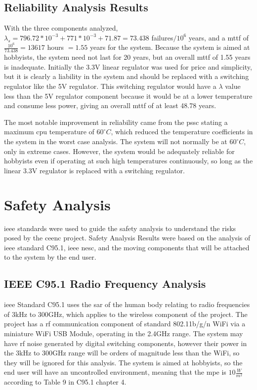 \subsection{Reliability Analysis Results}
With the three components analyzed, $\lambda_s=796.72*10^{-3}+771*10^{-3}+71.87=73.438$ failures$/10^6$ years, and a \gls{mttf} of $\frac{10^6}{73.438}=13617$ hours $=1.55$ years for the system.
Because the system is aimed at hobbyists, the system need not last for 20 years, but an overall \gls{mttf} of 1.55 years is inadequate.
Initially the 3.3V linear regulator was used for price and simplicity, but it is clearly a liability in the system and should be replaced with a switching regulator like the 5V regulator.
This switching regulator would have a $\lambda$ value less than the 5V regulator component because it would be at a lower temperature and consume less power, giving an overall \gls{mttf} of at least 48.78 years.

The most notable improvement in reliability came from the \gls{pssc} stating a maximum \gls{cpu} temperature of $60^{\circ}C$, which reduced the temperature coefficients in the system in the worst case analysis.
The system will not normally be at $60^{\circ}C$, only in extreme cases.
However, the system would be adequately reliable for hobbyists even if operating at such high temperatures continuously, so long as the linear 3.3V regulator is replaced with a switching regulator.

\section{Safety Analysis}
\gls{ieee} standards were used to guide the safety analysis to understand the risks posed by the \gls{ceenc} project.
Safety Analysis Results were based on the analysis of \gls{ieee} standard C95.1\cite{ieeec951}, \gls{ieee} \gls{nesc}\cite{ieeenesc}, and the moving components that will be attached to the system by the end user. 

\subsection{IEEE C95.1 Radio Frequency Analysis}
\gls{ieee} Standard C95.1\cite{ieeec951} uses the \gls{sar} of the human body relating to radio frequencies of 3kHz to 300GHz, which applies to the wireless component of the project.
The project has a \gls{rf} communication component of standard 802.11b/g/n WiFi via a miniature WiFi USB Module, operating in the 2.4GHz range.
The system may have \gls{rf} noise generated by digital switching components, however their power in the 3kHz to 300GHz range will be orders of magnitude less than the WiFi, so they will be ignored for this analysis.
The system is aimed at hobbyists, so the end user will have an uncontrolled environment, meaning that the \gls{mpe} is $10\frac{W}{m^2}$ according to Table 9 in C95.1 chapter 4\cite{ieeec951}.

